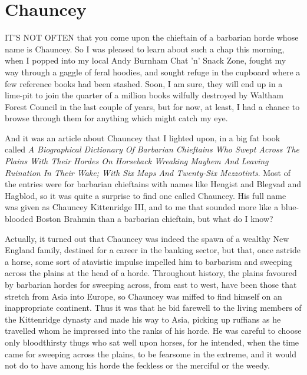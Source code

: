 \chapter{Chauncey}

IT'S NOT OFTEN that you come upon the chieftain of a barbarian horde whose name is Chauncey. So I was pleased to learn about such a chap this morning, when I popped into my local Andy Burnham Chat 'n' Snack Zone, fought my way through a gaggle of feral hoodies, and sought refuge in the cupboard where a few reference books had been stashed. Soon, I am sure, they will end up in a lime-pit to join the quarter of a million books wilfully destroyed by Waltham Forest Council in the last couple of years, but for now, at least, I had a chance to browse through them for anything which might catch my eye.

And it was an article about Chauncey that I lighted upon, in a big fat book called \emph{A Biographical Dictionary Of Barbarian Chieftains Who Swept Across The Plains With Their Hordes On Horseback Wreaking Mayhem And Leaving Ruination In Their Wake; With Six Maps And Twenty-Six Mezzotints}. Most of the entries were for barbarian chieftains with names like Hengist and Blegvad and Hagblod, so it was quite a surprise to find one called Chauncey. His full name was given as Chauncey Kittenridge III, and to me that sounded more like a blue-blooded Boston Brahmin than a barbarian chieftain, but what do I know?

Actually, it turned out that Chauncey was indeed the spawn of a wealthy New England family, destined for a career in the banking sector, but that, once astride a horse, some sort of atavistic impulse impelled him to barbarism and sweeping across the plains at the head of a horde. Throughout history, the plains favoured by barbarian hordes for sweeping across, from east to west, have been those that stretch from Asia into Europe, so Chauncey was miffed to find himself on an inappropriate continent. Thus it was that he bid farewell to the living members of the Kittenridge dynasty and made his way to Asia, picking up ruffians as he travelled whom he impressed into the ranks of his horde. He was careful to choose only bloodthirsty thugs who sat well upon horses, for he intended, when the time came for sweeping across the plains, to be fearsome in the extreme, and it would not do to have among his horde the feckless or the merciful or the weedy.

